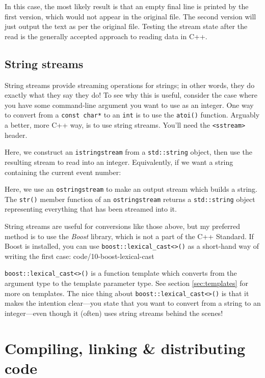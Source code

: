 \documentclass[a4paper]{scrartcl}
\begin{document}




In this case, the most likely result is that an empty final line is printed by the first version, which would not appear in the original file. The second version will just output the text as per the original file. Testing the stream state after the read is the generally accepted approach to reading data in C++.

\subsection{String streams}
String streams provide streaming operations for strings; in other words, they do exactly what they say they do! To see why this is useful, consider the case where you have some command-line argument you want to use as an integer. One way to convert from a \verb|const char*| to an \verb|int| is to use the \verb|atoi()| function. Arguably a better, more C++ way, is to use string streams. You'll need the \verb|<sstream>| header.


Here, we construct an \verb|istringstream| from a \verb|std::string| object, then use the resulting stream to read into an integer. Equivalently, if we want a string containing the current event number:



Here, we use an \verb|ostringstream| to make an output stream which builds a string. The \verb|str()| member function of an \verb|ostringstream| returns a \verb|std::string| object representing everything that has been streamed into it.

String streams are useful for conversions like those above, but my preferred method is to use the \emph{Boost} library, which is not a part of the C++ Standard. If Boost is installed, you can use \verb|boost::lexical_cast<>()| as a short-hand way of writing the first case:
 {code/10-boost-lexical-cast}

\verb|boost::lexical_cast<>()| is a function template which converts from the argument type to the template parameter type. See section \ref{sec:templates} for more on templates. The nice thing about \verb|boost::lexical_cast<>()| is that it makes the intention clear---you state that you want to convert from a string to an integer---even though it (often) uses string streams behind the scenes!

\section{Compiling, linking \& distributing code}\label{sec:compiling}
\end{document}
